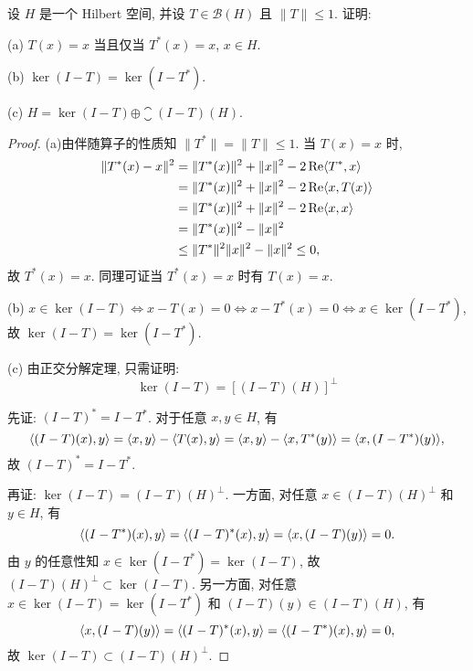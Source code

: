 \begin{exercise}
    设 $H$ 是一个 Hilbert 空间, 并设 $T\in\mathcal{B}(H)$ 且 $\|T\|\leq 1$. 证明:

    (a) $T(x)=x$ 当且仅当 $T^*(x)=x$, $x\in H$.

    (b) $\ker(I-T)=\ker(I-T^*)$.

    (c) $H=\ker(I-T)\oplus\closure{(I-T)(H)}$.
\end{exercise}

\begin{proof}
    (a)由伴随算子的性质知 $\|T^*\|=\|T\|\leq 1$. 当 $T(x)=x$ 时,
    \begin{align*}
        \|T^*(x)-x\|^2
        & =\|T^*(x)\|^2+\|x\|^2-2\operatorname{Re}\langle T^*,x\rangle \\
        & =\|T^*(x)\|^2+\|x\|^2-2\operatorname{Re}\langle x,T(x)\rangle \\
        & =\|T^*(x)\|^2+\|x\|^2-2\operatorname{Re}\langle x,x\rangle \\
        & =\|T^*(x)\|^2-\|x\|^2 \\
        & \leq\|T^*\|^2\|x\|^2-\|x\|^2\leq 0,
    \end{align*}
    故 $T^*(x)=x$. 同理可证当 $T^*(x)=x$ 时有 $T(x)=x$.

    (b) $x\in\ker(I-T)\Leftrightarrow x-T(x)=0\Leftrightarrow x-T^{*}(x)=0\Leftrightarrow x\in\ker(I-T^{*})$, 
    故 $\ker(I-T)=\ker(I-T^{*})$.

    (c) 由正交分解定理, 只需证明:
    \[\ker(I-T)=[(I-T)(H)]^{\perp}\]

    先证: $(I-T)^*=I-T^*$. 对于任意 $x,y\in H$, 有
    \[\langle(I-T)(x),y\rangle=\langle x,y\rangle-\langle T(x),y\rangle=\langle x,y\rangle-\langle x,T^*(y)\rangle=\langle x,(I-T^*)(y)\rangle,\]
    故 $(I-T)^*=I-T^*$.

    再证: $\ker(I-T)=(I-T)(H)^{\perp}$.
    一方面, 对任意 $x\in (I-T)(H)^{\perp}$ 和 $y\in H$, 有
    \[\langle(I-T^*)(x),y\rangle=\langle(I-T)^*(x),y\rangle=\langle x,(I-T)(y)\rangle=0.\]
    由 $y$ 的任意性知 $x\in\ker(I-T^*)=\ker(I-T)$, 故 $(I-T)(H)^{\perp}\subset\ker(I-T)$.
    另一方面, 对任意 $x\in\ker(I-T)=\ker(I-T^*)$ 和 $(I-T)(y)\in (I-T)(H)$, 有
    \[\langle x,(I-T)(y)\rangle=\langle(I-T)^*(x),y\rangle=\langle(I-T^*)(x),y\rangle=0,\]
    故 $\ker(I-T)\subset (I-T)(H)^{\perp}$.
\end{proof}



